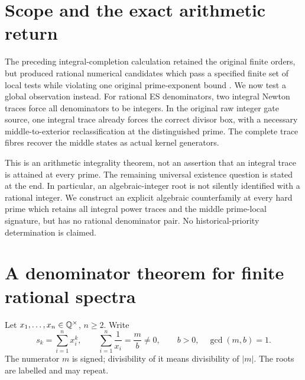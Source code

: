 \section{Scope and the exact arithmetic return}
The preceding integral-completion calculation retained the original finite
orders, but produced rational numerical candidates which pass a specified finite
set of local tests while violating one original prime-exponent bound
\cite[\S\,``One unavailable prime occurrence'']{Previous}. We now test a global
observation instead. For rational ES denominators, two integral Newton traces
force all denominators to be integers. In the original raw integer gate source,
one integral trace already forces the correct divisor box, with a necessary
middle-to-exterior reclassification at the distinguished prime. The complete
trace fibres recover the middle states as actual kernel generators.

This is an arithmetic integrality theorem, not an assertion that an integral
trace is attained at every prime. The remaining universal existence question is
stated at the end. In particular, an algebraic-integer root is not silently
identified with a rational integer. We construct an explicit algebraic
counterfamily at every hard prime which retains all integral power traces and
the middle prime-local signature, but has no rational denominator pair.
No historical-priority determination is claimed.

\section{A denominator theorem for finite rational spectra}
Let $x_1,\ldots,x_n\in\mathbb Q^\times$, $n\ge2$. Write
\[
 s_k=\sum_{i=1}^n x_i^k,\qquad
 \sum_{i=1}^n\frac1{x_i}=\frac{m}{b}\ne0,
 \qquad b>0,\quad\gcd(m,b)=1.
\]
The numerator $m$ is signed; divisibility of it means divisibility of $|m|$.
The roots are labelled and may repeat.

